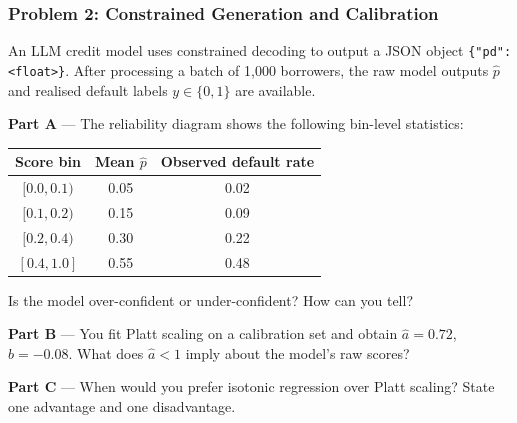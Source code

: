 \documentclass[9pt,t]{beamer}
\begin{document}
\begin{frame}
\frametitle{Problem 2: Constrained Generation and Calibration}

An LLM credit model uses constrained decoding to output a JSON object \texttt{\{"pd": <float>\}}.
After processing a batch of 1,000 borrowers, the raw model outputs $\hat{p}$ and realised
default labels $y \in \{0, 1\}$ are available.

\medskip
\textbf{Part A} --- The reliability diagram shows the following bin-level statistics:

\begin{center}
\small
\begin{tabular}{ccc}
\toprule
Score bin & Mean $\hat{p}$ & Observed default rate \\
\midrule
$[0.0, 0.1)$ & 0.05 & 0.02 \\
$[0.1, 0.2)$ & 0.15 & 0.09 \\
$[0.2, 0.4)$ & 0.30 & 0.22 \\
$[0.4, 1.0]$ & 0.55 & 0.48 \\
\bottomrule
\end{tabular}
\end{center}

Is the model over-confident or under-confident? How can you tell?

\medskip
\textbf{Part B} --- You fit Platt scaling on a calibration set and obtain $\hat{a} = 0.72$, $\hat{b} = -0.08$.
What does $\hat{a} < 1$ imply about the model's raw scores?

\medskip
\textbf{Part C} --- When would you prefer isotonic regression over Platt scaling? State one advantage and one disadvantage.
\end{frame}
\end{document}
